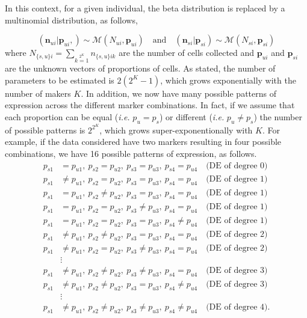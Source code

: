 \documentclass[11pt]{article}
\begin{document}
In this context, for a given individual,  the beta distribution is replaced by a multinomial distribution, as follows,

\[
 (\mathbf{n}_{ui}|\mathbf{p}_{ui},) \sim \mathcal{M}(N_{ui},\mathbf{p}_{ui}) \quad\mathrm{and}\quad (\mathbf{n}_{si}|\mathbf{p}_{si}) \sim \mathcal{M}(N_{si},\mathbf{p}_{si})
\]
where $N_{\{s,u\}i}=\sum\limits_{k=1}\limits^{2^K} n_{\{s,u\}ik}$ are the number of cells collected and $\mathbf{p}_{ui}$ and $\mathbf{p}_{si}$ are the unknown vectors of proportions of cells. 
As stated, the number of parameters to be estimated is $2(2^K-1)$, which grows exponentially with the number of makers $K$. In addition, we now have many possible patterns of expression across the different marker combinations. 
In fact, if we assume that each proportion can be equal (\textit{i.e.} $p_u=p_s$) or different (\textit{i.e.} $p_u\ne p_s$) the number of possible patterns is $2^{2^{K}}$, which grows super-exponentionally with $K$.
For example, if the data considered have two markers resulting in four possible combinations, we have 16 possible patterns of expression, as follows.
\begin{align*}
p_{s1}&= p_{u1},\ p_{s2}= p_{u2},\ p_{s3}= p_{u3},\ p_{s4}= p_{u4} \quad \text{(DE of degree 0)}\\
p_{s1}&\ne p_{u1},\ p_{s2}= p_{u2},\ p_{s3}= p_{u3},\ p_{s4}= p_{u4} \quad \text{(DE of degree 1)}\\
p_{s1}&= p_{u1},\ p_{s2}\ne p_{u2},\ p_{s3}= p_{u3},\ p_{s4}= p_{u4} \quad \text{(DE of degree 1)}\\
p_{s1}&= p_{u1},\ p_{s2}= p_{u2},\ p_{s3}\ne p_{u3},\ p_{s4}= p_{u4} \quad \text{(DE of degree 1)}\\
p_{s1}&= p_{u1},\ p_{s2}= p_{u2},\ p_{s3}= p_{u3},\ p_{s4}\ne p_{u4} \quad \text{(DE of degree 1)}\\
p_{s1}&\ne p_{u1},\ p_{s2}\ne p_{u2},\ p_{s3}= p_{u3},\ p_{s4}= p_{u4} \quad \text{(DE of degree 2)}\\
p_{s1}&\ne p_{u1},\ p_{s2}= p_{u2},\ p_{s3}\ne p_{u3},\ p_{s4}= p_{u4} \quad \text{(DE of degree 2)}\\
&\vdots\\
p_{s1}&\ne p_{u1},\ p_{s2}\ne p_{u2},\ p_{s3}\ne p_{u3},\ p_{s4}= p_{u4} \quad \text{(DE of degree 3)}\\
p_{s1}&\ne p_{u1},\ p_{s2}\ne p_{u2},\ p_{s3}= p_{u3},\ p_{s4}\ne p_{u4} \quad \text{(DE of degree 3)}\\
&\vdots\\
p_{s1}&\ne p_{u1},\ p_{s2}\ne p_{u2},\ p_{s3}\ne p_{u3},\ p_{s4}\ne p_{u4} \quad \text{(DE of degree 4)}.
\end{align*}
\end{document}
